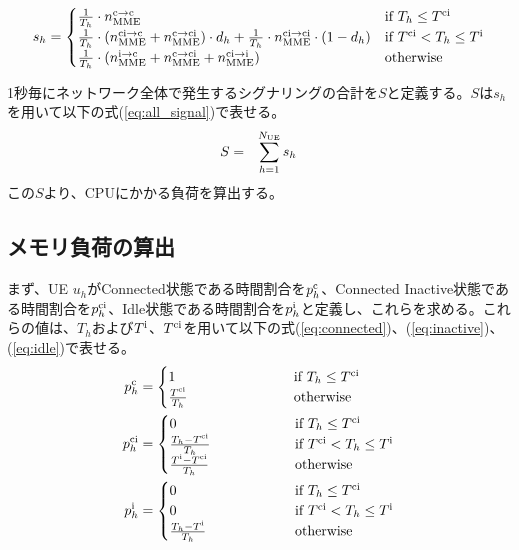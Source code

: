 \documentclass[a4j]{ujarticle}
\begin{document}
\begin{equation}
  s_h  =
  \begin{cases}
		\frac{1}{T_h} \cdot n_{\rm MME}^{\rm c \to \rm c} & \text{if $T_h \le T^{\rm ci}$} \\
    \frac{1}{T_h} \cdot (n_{\rm MME}^{\rm ci \to \rm c} + n_{\rm MME}^{\rm c \to \rm ci}) \cdot d_h  + \frac{1}{T_h} \cdot n_{\rm MME}^{\rm ci \to \rm ci} \cdot (1 - d_h) & \text{if $T^{\rm ci} < T_h \le T^{\rm i}$} \\
    \frac{1}{T_h} \cdot (n_{\rm MME}^{\rm i \to \rm c} + n_{\rm MME}^{\rm c \to \rm ci} + n_{\rm MME}^{\rm ci \to \rm i}) & \text{otherwise}
  \end{cases}
  \label{eq:attach_detach}
\end{equation}

1秒毎にネットワーク全体で発生するシグナリングの合計を$S$と定義する。$S$は$s_h$を用いて以下の式(\ref{eq:all_signal})で表せる。
\begin{eqnarray}
  S & = & \sum_{h = 1}^{N_{\rm UE}} s_h \label{eq:all_signal}
\end{eqnarray}
この$S$より、CPUにかかる負荷を算出する。

\subsection{メモリ負荷の算出}
\label{sec:memory}
まず、UE $u_h$がConnected状態である時間割合を$p^{\rm c}_h$、Connected Inactive状態である時間割合を$p^{\rm ci}_h$、Idle状態である時間割合を$p^{\rm i}_h$と定義し、これらを求める。これらの値は、$T_h$および$T^{\rm i}$、$T^{\rm ci}$を用いて以下の式(\ref{eq:connected})、(\ref{eq:inactive})、(\ref{eq:idle})で表せる。
\begin{align}
	p^{\rm c}_h & =
	\begin{cases}
    1 \hphantom{100000000000000} & \text{if $T_h \le T^{\rm ci}$}\\
    \frac{T^{\rm ci}}{T_h} & \text{otherwise}
  \end{cases} \label{eq:connected}\\
	p^{\rm ci}_h & =
  \begin{cases}
    0 \hphantom{100000000000000} & \text{if $T_h \le T^{\rm ci}$}\\
		\frac{T_h - T^{\rm ci}}{T_h} & \text{if $T^{\rm ci} < T_h \le T^{\rm i}$}\\
    \frac{T^{\rm i} - T^{\rm ci}}{T_h} & \text{otherwise}
  \end{cases} \label{eq:inactive}\\
	p^{\rm i}_h & =
  \begin{cases}
    0 \hphantom{100000000000000} & \text{if $T_h \le T^{\rm ci}$}\\
		0 & \text{if $T^{\rm ci} < T_h \le T^{\rm i}$}\\
    \frac{T_h - T^{\rm i}}{T_h} & \text{otherwise}
  \end{cases}\label{eq:idle}
\end{align}
\end{document}

